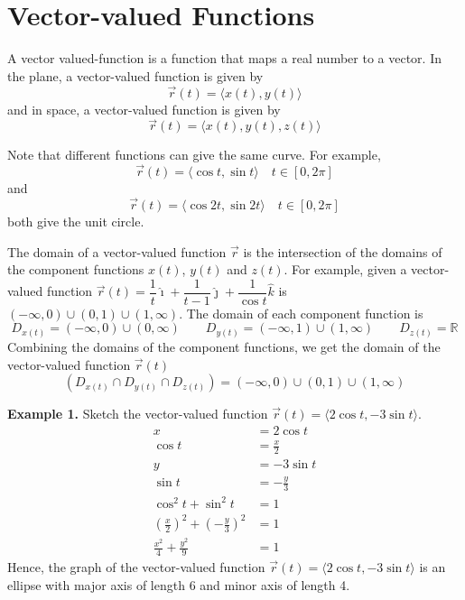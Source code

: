 \chapter{Vector-valued Functions}

A vector valued-function is a function that maps a real number to a vector. In
the plane, a vector-valued function is given by \[\vec{r}(t) = \langle x(t),
    y(t) \rangle\] and in space, a vector-valued function is given by \[\vec{r}(t) =
    \langle x(t), y(t), z(t) \rangle\]

Note that different functions can give the same curve. For example, \[\vec{r}(t) = \langle \cos t, \sin t \rangle \quad t \in [0, 2\pi]\]
and \[\vec{r}(t) = \langle \cos 2t, \sin 2t \rangle \quad t \in [0, 2\pi]\]
both give the unit circle.

The domain of a vector-valued function $\vec{r}$ is the intersection of the
domains of the component functions $x(t)$, $y(t)$ and $z(t)$. For example,
given a vector-valued function $\vec{r}(t) = \dfrac{1}{t}\hat{\imath} +
    \dfrac{1}{t-1}\hat{\jmath} + \dfrac{1}{\cos t}\hat{k}$ is $(-\infty, 0) \cup
    (0, 1) \cup (1, \infty)$. The domain of each component function is \[D_{x(t)} = (-\infty, 0) \cup (0, \infty) \qquad D_{y(t)} = (-\infty, 1) \cup (1, \infty) \qquad D_{z(t)} = \mathbb{R}\]
Combining the domains of the component functions, we get the domain of the
vector-valued function $\vec{r}(t)$ \[(D_{x(t)} \cap D_{y(t)} \cap D_{z(t)}) = (-\infty, 0) \cup (0, 1) \cup (1, \infty)\]

\newpage
\noindent\textbf{Example 1. } Sketch the vector-valued function $\vec{r}(t) = \langle 2\cos t, -3\sin t \rangle$.
\begin{align*}
    x                                                        & = 2\cos t      \\
    \cos t                                                   & = \frac{x}{2}  \\
    y                                                        & = -3\sin t     \\
    \sin t                                                   & = -\frac{y}{3} \\
    \cos^2t + \sin^2t                                        & = 1            \\
    \left(\frac{x}{2}\right)^2 + \left(-\frac{y}{3}\right)^2 & = 1            \\
    \frac{x^2}{4} + \frac{y^2}{9}                            & = 1
\end{align*}
Hence, the graph of the vector-valued function $\vec{r}(t) = \langle 2\cos t, -3\sin t \rangle$ is an ellipse with major axis of length 6 and minor axis of length 4.

